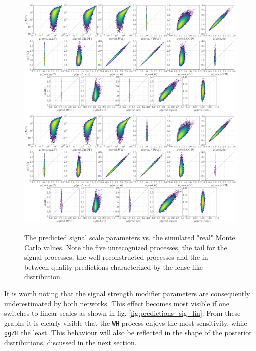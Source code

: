 \begin{figure}[h!]
	\centering
	\includegraphics[width=\linewidth]{figures/inference/p}
	\includegraphics[width=\linewidth]{figures/inference/p_SN}
	\caption{The predicted signal scale parameters vs. the simulated "real" Monte Carlo values. Note the five unrecognized processes, the tail for the signal processes, the well-reconstructed processes and the in-between-quality predictions characterized by the lense-like distribution.}
	\label{fig:predictions}
\end{figure}

It is worth noting that the signal strength modifier parameters are consequently underestimated by both networks. This effect becomes most visible if one switches to linear scales as shown in fig. \ref{fig:predictions_sig_lin}. From these graphs it is clearly visible that the \texttt{WH} process enjoys the most sensitivity, while \texttt{ggZH} the least. This behaviour will also be reflected in the shape of the posterior distributions, discussed in the next section.

